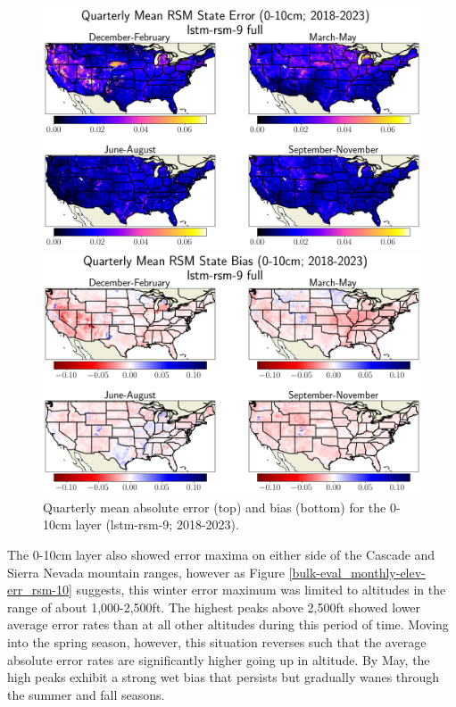 \begin{figure}[hp!]
    \centering

    \includegraphics[width=.99\linewidth,draft=false]{figures/grid-eval_qtrly/eval-grid_full_lstm-rsm-9_pixelwise-time-stats_abs-err_qtrly-err-state-rsm-10.png}


    \includegraphics[width=.99\linewidth,draft=false]{figures/grid-eval_qtrly/eval-grid_full_lstm-rsm-9_pixelwise-time-stats_bias_qtrly-err-state-rsm-10.png}

    \caption{Quarterly mean absolute error (top) and bias (bottom) for the 0-10cm layer (lstm-rsm-9; 2018-2023).}
    \label{bulk-eval_qtrly_rsm-10}
\end{figure}

The 0-10cm layer also showed error maxima on either side of the Cascade and Sierra Nevada mountain ranges, however as Figure \ref{bulk-eval_monthly-elev-err_rsm-10} suggests, this winter error maximum was limited to altitudes in the range of about 1,000-2,500ft. The highest peaks above 2,500ft showed lower average error rates than at all other altitudes during this period of time. Moving into the spring season, however, this situation reverses such that the average absolute error rates are significantly higher going up in altitude. By May, the high peaks exhibit a strong wet bias that persists but gradually wanes through the summer and fall seasons.

